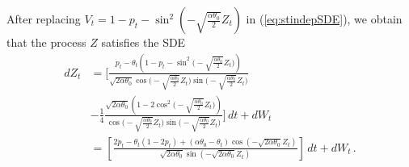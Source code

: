 \documentclass[11pt]{article}
\theoremstyle{definition}
\begin{document}
After replacing $V_t = 1 - p_t - \sin^2 \left(- \sqrt{ \frac{ \alpha \theta_0}{2} } Z_t \right) $ in (\ref{eq:stindepSDE}), we obtain that the  process $Z$ satisfies the SDE
\begin{align}
dZ_t & = \Bigg[ \frac{ \dot{p}_t  - \theta_t  \left(1 - p_t - \sin^2 \Big(- \sqrt{ \frac{ \alpha \theta_0}{2} } Z_t \Big) \right) }{\sqrt{2 \alpha \theta_0} \cos\Big(- \sqrt{ \frac{ \alpha \theta_0}{2} } Z_t \Big)  \sin\Big(- \sqrt{ \frac{ \alpha \theta_0}{2} } Z_t \Big)}  \nonumber \\
&  - \frac{1}{4}  \frac{\sqrt{2 \alpha \theta_0} \left(1 - 2 \cos^2 \Big(- \sqrt{ \frac{ \alpha \theta_0}{2} } Z_t \Big) \right) }{\cos\Big(- \sqrt{ \frac{ \alpha \theta_0}{2} } Z_t \Big)  \sin\Big(- \sqrt{ \frac{ \alpha \theta_0}{2} } Z_t \Big)} \Bigg] \,dt + dW_t \nonumber \\
&  = \left[  \frac{  2  \dot{p}_t - \theta_t (1 - 2 p_t)  + (\alpha \theta_0 - \theta_t) \cos(- \sqrt{2 \alpha \theta_0 } Z_t) }{\sqrt{2 \alpha \theta_0} \sin{(- \sqrt{2 \alpha \theta_0} Z_t)}}  \right] \,dt + dW_t \,. 
\end{align}
\end{document}
